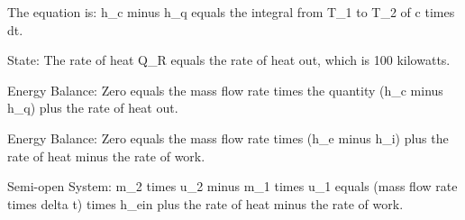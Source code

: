 The equation is:
h_c minus h_q equals the integral from T_1 to T_2 of c times dt.

State:
The rate of heat Q_R equals the rate of heat out, which is 100 kilowatts.

Energy Balance:
Zero equals the mass flow rate times the quantity (h_c minus h_q) plus the rate of heat out.

Energy Balance:
Zero equals the mass flow rate times (h_e minus h_i) plus the rate of heat minus the rate of work.

Semi-open System:
m_2 times u_2 minus m_1 times u_1 equals (mass flow rate times delta t) times h_ein plus the rate of heat minus the rate of work.